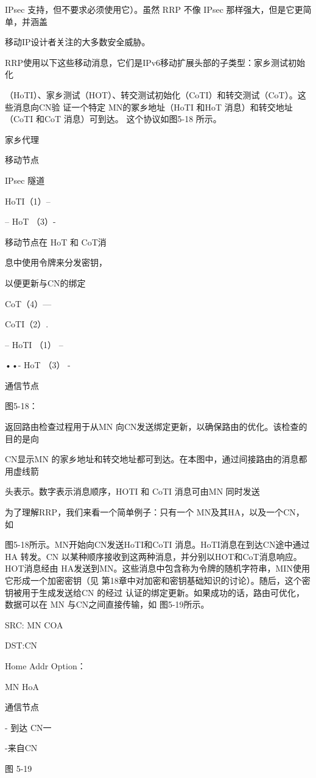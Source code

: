 IPsec 支持，但不要求必须使用它）。虽然 RRP 不像 IPsec 那样强大，但是它更简单，并涵盖

移动IP设计者关注的大多数安全威胁。

RRP使用以下这些移动消息，它们是IPv6移动扩展头部的子类型：家乡测试初始化

（HoTI）、家乡测试（HOT）、转交测试初始化（CoTI）和转交测试（CoT）。这些消息向CN验
证一个特定 MN的冢乡地址（HoTI 和HoT 消息）和转交地址（CoTI 和CoT 消息）可到达。
这个协议如图5-18 所示。

家乡代理

移动节点

IPsec 隧道

HoTI（1）--

-- HoT （3）-

移动节点在 HoT 和 CoT消

息中使用令牌来分发密钥，

以便更新与CN的绑定

CoT（4）—

CoTI（2）.

-- HoTI （1） --

••- HoT （3） -

通信节点

图5-18：

返回路由检查过程用于从MN 向CN发送绑定更新，以确保路由的优化。该检查的目的是向

CN显示MN 的家乡地址和转交地址都可到达。在本图中，通过间接路由的消息都用虚线箭

头表示。数字表示消息顺序，HOTI 和 CoTI 消息可由MN 同时发送

为了理解RRP，我们来看一个简单例子：只有一个 MN及其HA，以及一个CN，如

图5-18所示。MN开始向CN发送HoTI和CoTI 消息。HoTI消息在到达CN途中通过HA
转发。CN 以某种顺序接收到这两种消息，并分别以HOT和CoT消息响应。HOT消息经由
HA发送到MN。这些消息中包含称为令牌的随机字符串，MIN使用它形成一个加密密钥（见
第18章中对加密和密钥基础知识的讨论）。随后，这个密钥被用于生成发送给CN 的经过
认证的绑定更新。如果成功的话，路由可优化，数据可以在 MN 与CN之间直接传输，如
图5-19所示。

SRC: MN COA

DST:CN

Home Addr Option：

MN HoA

通信节点

- 到达 CN一

-来自CN

图 5-19

